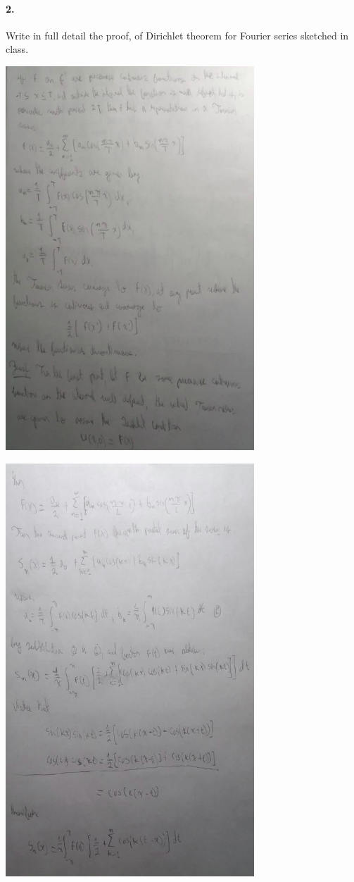 \documentclass{article}
\begin{document}
\paragraph{2.} Write in full detail the proof, of Dirichlet theorem for Fourier series sketched in class.
\begin{center}
	\includegraphics[width=0.7\textwidth]{img/2-1-1.png}
\end{center}
\begin{center}
	\includegraphics[width=0.7\textwidth]{img/2-1-2.png}
\end{center}
\end{document}
